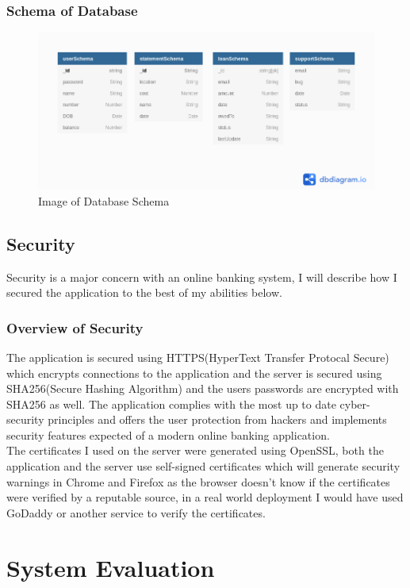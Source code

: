 \subsection{Schema of Database}
\begin{figure}[hb]
\includegraphics[width=\textwidth]{img/databasediagram.png}
\caption{Image of Database Schema}
\label{fig:Image of Database Schema}
\end{figure}
\section{Security}
Security is a major concern with an online banking system, I will describe how I secured the application to the best of my abilities below.
\subsection{Overview of Security}
The application is secured using HTTPS(HyperText Transfer Protocal Secure) which encrypts connections to the application and the server
is secured using SHA256(Secure Hashing Algorithm) and the users passwords are encrypted with SHA256 as well.  The application complies with the most up to date cyber-security principles and offers the user protection from hackers and implements security features expected of a modern online banking application.
\\
The certificates I used on the server were generated using OpenSSL, both the application and the server use self-signed certificates which will generate security warnings in Chrome and Firefox as the browser doesn't know if the certificates were verified by a reputable source, in a real world deployment I would have used GoDaddy or another service to verify the certificates.
\chapter{System Evaluation}
